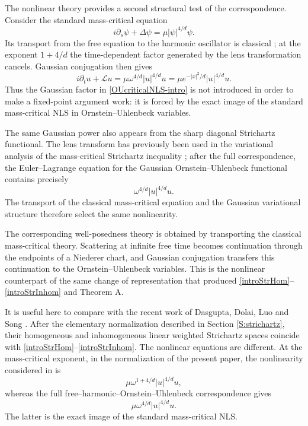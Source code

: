 \documentclass[11pt,a4paper]{amsart}
\numberwithin{equation}{section}
\numberwithin{equation}{section}
\begin{document}
The nonlinear theory provides a second structural test of the
correspondence.  Consider the standard mass-critical equation
\begin{equation}\label{freecriticalNLS-intro}
i\partial_s\psi+\Delta\psi
=
\mu|\psi|^{4/d}\psi.
\end{equation}
Its transport from the free equation to the harmonic oscillator is
classical \cite{Carles,TaoLens}; at the exponent $1+4/d$ the
time-dependent factor generated by the lens transformation cancels.
Gaussian conjugation then gives
\begin{equation}\label{OUcriticalNLS-intro}
i\partial_tu+\mathscr Lu
=
\mu\omega^{4/d}|u|^{4/d}u
=
\mu e^{-|x|^2/d}|u|^{4/d}u.
\end{equation}
Thus the Gaussian factor in \eqref{OUcriticalNLS-intro} is not
introduced in order to make a fixed-point argument work: it is
forced by the exact image of the standard mass-critical NLS in
Ornstein--Uhlenbeck variables.

The same Gaussian power also appears from the sharp diagonal
Strichartz functional.  The lens transform has previously been used
in the variational analysis of the mass-critical Strichartz
inequality \cite{DMR}; after the full correspondence, the
Euler--Lagrange equation for the Gaussian Ornstein--Uhlenbeck
functional contains precisely
\[
\omega^{4/d}|u|^{4/d}u.
\]
The transport of the classical mass-critical equation and the
Gaussian variational structure therefore select the same
nonlinearity.

The corresponding well-posedness theory is obtained by transporting
the classical mass-critical theory.  Scattering at infinite free
time becomes continuation through the endpoints of a Niederer chart,
and Gaussian conjugation transfers this continuation to the
Ornstein--Uhlenbeck variables.  This is the nonlinear counterpart of
the same change of representation that produced
\eqref{introStrHom}--\eqref{introStrInhom} and Theorem A.

It is useful here to compare with the recent work of Dasgupta, Dolai,
Luo and Song \cite{DDLS}.  After the elementary normalization
described in Section \ref{S:strichartz}, their homogeneous and
inhomogeneous linear weighted Strichartz spaces coincide with
\eqref{introStrHom}--\eqref{introStrInhom}.  The nonlinear equations
are different.  At the mass-critical exponent, in the normalization
of the present paper, the nonlinearity considered in \cite{DDLS} is
\[
\mu\omega^{1+4/d}|u|^{4/d}u,
\]
whereas the full free--harmonic--Ornstein--Uhlenbeck correspondence
gives
\[
\mu\omega^{4/d}|u|^{4/d}u.
\]
The latter is the exact image of the standard mass-critical NLS.
\end{document}
